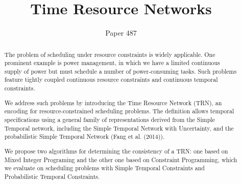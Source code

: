 \documentclass{article}
\title{Time Resource Networks}
\author{Paper 487}
\begin{document}
\maketitle

\begin{abstract}
  The problem of scheduling under resource constraints is widely applicable. One prominent example is power management, in which we have a limited continuous supply of power but must schedule a number of power-consuming tasks. Such problems feature tightly coupled continuous resource constraints and continuous temporal constraints.

  We address such problems by introducing the Time Resource Network (TRN), an encoding for resource-constrained scheduling problems. The definition allows temporal specifications using a general family of representations derived from the Simple Temporal network, including the Simple Temporal Network with Uncertainty, and the probabilistic Simple Temporal Network (Fang et al. (2014)).

  We propose two algorithms for determining the consistency of a TRN: one based on Mixed Integer Programing and the other one based on Constraint Programming, which we evaluate on scheduling problems with Simple Temporal Constraints and Probabilistic Temporal Constraints.
\end{abstract}











%
\end{document}
